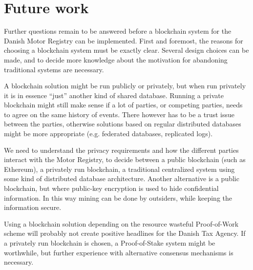 \documentclass[oneside,a4paper,10pts,article]{memoir}
\begin{document}






\chapter{Future work}
\label{sec:futurework}
Further questions remain to be answered before a blockchain system for
the Danish Motor Registry can be implemented.  First and foremost, the
reasons for choosing a blockchain system must be exactly
clear. Several design choices can be made, and to decide more
knowledge about the motivation for abandoning traditional systems are
necessary.

A blockchain solution might be run publicly or privately, but when run
privately it is in essence ``just'' another kind of shared
database. Running a private blockchain might still make sense if a lot
of parties, or competing parties, needs to agree on the same history
of events. There however has to be a trust issue between the parties,
otherwise solutions based on regular distributed databases might be
more appropriate (e.g. federated databases, replicated logs). 

We need to understand the privacy requirements and how the different
parties interact with the Motor Registry, to decide between a public
blockchain (such as Ethereum), a privately run blockchain, a
traditional centralized system using some kind of distributed database
architecture. Another alternative is a public blockchain, but where
public-key encryption is used to hide confidential information. In
this way mining can be done by outsiders, while keeping the
information secure.

Using a blockchain solution depending on the resource wasteful
Proof-of-Work scheme will probably not create positive headlines for
the Danish Tax Agency. If a privately run blockchain is chosen, a
Proof-of-Stake system might be worthwhile, but further experience with
alternative consensus mechanisms is necessary.
\end{document}
